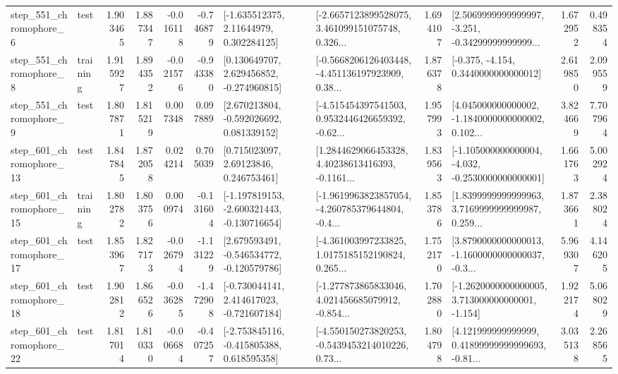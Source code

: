 \begin{tabular}{llrrrrllrlrr}
   step\_551\_chromophore\_6 &      test &      1.903465 &    1.887347 &     -0.016118 & -0.746879 &     [-1.635512375, 2.11644979, 0.302284125] &  [-2.6657123899528075, 3.461099151075748, 0.326... &       1.694107 &  [2.5069999999999997, -3.251, -0.34299999999999... &            1.672952 &          0.498354 \\
   step\_551\_chromophore\_8 &  training &      1.915927 &    1.894352 &     -0.021576 & -0.943380 &    [0.130649707, 2.629456852, -0.274960815] &  [-0.5668206126403448, -4.451136197923909, 0.38... &       1.876378 &               [-0.375, -4.154, 0.3440000000000012] &            2.619850 &          2.099559 \\
   step\_551\_chromophore\_9 &      test &      1.807871 &    1.815219 &      0.007348 &  0.097889 &    [2.670213804, -0.592026692, 0.081339152] &  [-4.515454397541503, 0.9532446426659392, -0.62... &       1.957993 &  [4.045000000000002, -1.1840000000000002, 0.102... &            3.824669 &          7.707964 \\
  step\_601\_chromophore\_13 &      test &      1.847845 &    1.872058 &      0.024214 &  0.705039 &      [0.715023097, 2.69123846, 0.246753461] &  [1.2844629066453328, 4.40238613416393, -0.1161... &       1.839563 &  [-1.105000000000004, -4.032, -0.2530000000000001] &            1.661763 &          5.002924 \\
  step\_601\_chromophore\_15 &  training &      1.802782 &    1.803756 &      0.000974 & -0.131604 &  [-1.197819153, -2.600321443, -0.130716654] &  [-1.9619963823857054, -4.260785379644804, -0.4... &       1.853786 &  [1.8399999999999963, 3.7169999999999987, 0.259... &            1.873661 &          2.388024 \\
  step\_601\_chromophore\_17 &      test &      1.853967 &    1.827173 &     -0.026794 & -1.131229 &   [2.679593491, -0.546534772, -0.120579786] &  [-4.361003997233825, 1.0175185152190824, 0.265... &       1.752170 &  [3.8790000000000013, -1.1600000000000037, -0.3... &            5.969307 &          4.146205 \\
  step\_601\_chromophore\_18 &      test &      1.902812 &    1.866526 &     -0.036285 & -1.472908 &   [-0.730044141, 2.414617023, -0.721607184] &  [-1.277873865833046, 4.021456685079912, -0.854... &       1.702880 &   [-1.2620000000000005, 3.713000000000001, -1.154] &            1.922174 &          5.068029 \\
  step\_601\_chromophore\_22 &      test &      1.817014 &    1.810330 &     -0.006684 & -0.407257 &   [-2.753845116, -0.415805388, 0.618595358] &  [-4.550150273820253, -0.5439453214010226, 0.73... &       1.804798 &  [4.121999999999999, 0.41899999999999693, -0.81... &            3.035138 &          2.268565 \\

\end{tabular}
